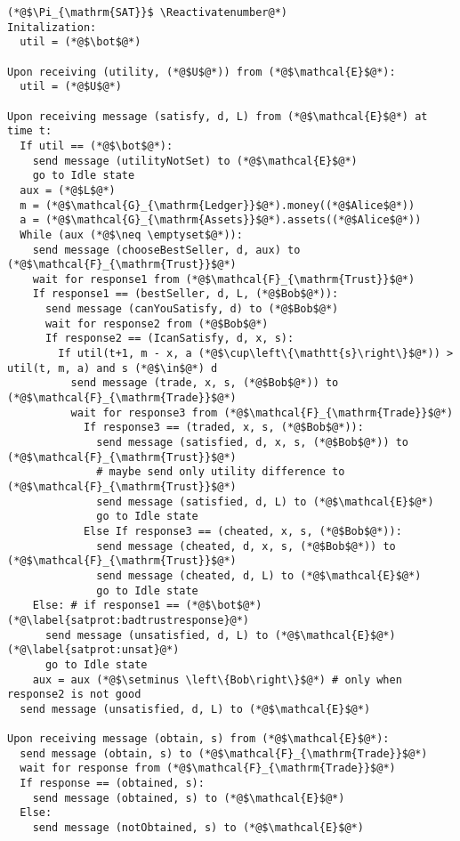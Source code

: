 \Suppressnumber
\begin{lstlisting}[label=satprot, style=numbers]
(*@$\Pi_{\mathrm{SAT}}$ \Reactivatenumber@*)
Initalization:
  util = (*@$\bot$@*)

Upon receiving (utility, (*@$U$@*)) from (*@$\mathcal{E}$@*):
  util = (*@$U$@*)

Upon receiving message (satisfy, d, L) from (*@$\mathcal{E}$@*) at time t:
  If util == (*@$\bot$@*):
    send message (utilityNotSet) to (*@$\mathcal{E}$@*)
    go to Idle state
  aux = (*@$L$@*)
  m = (*@$\mathcal{G}_{\mathrm{Ledger}}$@*).money((*@$Alice$@*))
  a = (*@$\mathcal{G}_{\mathrm{Assets}}$@*).assets((*@$Alice$@*))
  While (aux (*@$\neq \emptyset$@*)):
    send message (chooseBestSeller, d, aux) to (*@$\mathcal{F}_{\mathrm{Trust}}$@*)
    wait for response1 from (*@$\mathcal{F}_{\mathrm{Trust}}$@*)
    If response1 == (bestSeller, d, L, (*@$Bob$@*)):
      send message (canYouSatisfy, d) to (*@$Bob$@*)
      wait for response2 from (*@$Bob$@*)
      If response2 == (IcanSatisfy, d, x, s):
        If util(t+1, m - x, a (*@$\cup\left\{\mathtt{s}\right\}$@*)) > util(t, m, a) and s (*@$\in$@*) d
          send message (trade, x, s, (*@$Bob$@*)) to (*@$\mathcal{F}_{\mathrm{Trade}}$@*)
          wait for response3 from (*@$\mathcal{F}_{\mathrm{Trade}}$@*)
            If response3 == (traded, x, s, (*@$Bob$@*)):
              send message (satisfied, d, x, s, (*@$Bob$@*)) to (*@$\mathcal{F}_{\mathrm{Trust}}$@*)
              # maybe send only utility difference to (*@$\mathcal{F}_{\mathrm{Trust}}$@*)
              send message (satisfied, d, L) to (*@$\mathcal{E}$@*)
              go to Idle state
            Else If response3 == (cheated, x, s, (*@$Bob$@*)):
              send message (cheated, d, x, s, (*@$Bob$@*)) to (*@$\mathcal{F}_{\mathrm{Trust}}$@*)
              send message (cheated, d, L) to (*@$\mathcal{E}$@*)
              go to Idle state
    Else: # if response1 == (*@$\bot$@*) (*@\label{satprot:badtrustresponse}@*)
      send message (unsatisfied, d, L) to (*@$\mathcal{E}$@*) (*@\label{satprot:unsat}@*)
      go to Idle state
    aux = aux (*@$\setminus \left\{Bob\right\}$@*) # only when response2 is not good
  send message (unsatisfied, d, L) to (*@$\mathcal{E}$@*)

Upon receiving message (obtain, s) from (*@$\mathcal{E}$@*):
  send message (obtain, s) to (*@$\mathcal{F}_{\mathrm{Trade}}$@*)
  wait for response from (*@$\mathcal{F}_{\mathrm{Trade}}$@*)
  If response == (obtained, s):
    send message (obtained, s) to (*@$\mathcal{E}$@*)
  Else:
    send message (notObtained, s) to (*@$\mathcal{E}$@*)


\end{lstlisting}
